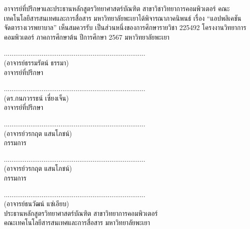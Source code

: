 \documentclass[a4paper,12pt]{upthesis}
\begin{document}
อาจารย์ที่ปรึกษาและประธานหลักสูตรวิทยาศาสตร์บัณฑิต สาขาวิชาวิทยาการคอมพิวเตอร์
คณะเทคโนโลยีสารสนเทศและการสื่อสาร มหาวิทยาลัยพะเยาได้พิจารณาภาคนิพนธ์ เรื่อง “แอปพลิเคชันจัดตารางเวรพยาบาล” เห็นสมควรรับ เป็นส่วนหนึ่งของการศึกษารายวิชา 225492 โครงงานวิทยาการคอมพิวเตอร์ ภาคการศึกษาต้น ปีการศึกษา 2567 มหาวิทยาลัยพะเยา
\vskip0.6cm
\normalsize
\begin{center}
\vskip2.0cm

...........................................................................\\
(อาจารย์ธรรมรัตน์ ธรรมา)\\		%
อาจารย์ที่ปรึกษา \\ 
\vskip2.0cm

...........................................................................\\
(ดร.กนกวรรธน์ เซี่ยงเจ็น)\\		%
อาจารย์ที่ปรึกษา \\ 
\vskip2.0cm

...........................................................................\\
(อาจารย์วรกฤต แสนโภชน์)\\			%
กรรมการ \\ 	
\vskip2.0cm

...........................................................................\\
(อาจารย์วรกฤต แสนโภชน์)\\			%
กรรมการ \\ 
\vskip2.0cm



...........................................................................\\
(อาจารย์ธนวัฒน์ แซ่เอียบ)\\
ประธานหลักสูตรวิทยาศาสตร์บัณฑิต สาขาวิทยาการคอมพิวเตอร์\\
คณะเทคโนโลยีสารสนเทศและการสื่อสาร มหาวิทยาลัยพะเยา \\
\end{center}
\clearpage
\end{document}
